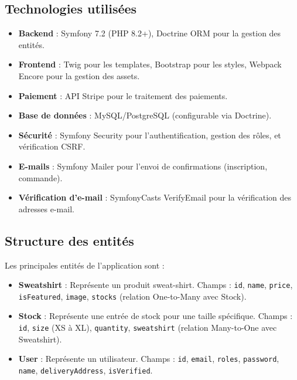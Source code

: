 \documentclass[a4paper,11pt]{article}
\begin{document}
\subsection{Technologies utilisées}
\begin{itemize}
    \item \textbf{Backend} : Symfony 7.2 (PHP 8.2+), Doctrine ORM pour la gestion des entités.
    \item \textbf{Frontend} : Twig pour les templates, Bootstrap pour les styles, Webpack Encore pour la gestion des assets.
    \item \textbf{Paiement} : API Stripe pour le traitement des paiements.
    \item \textbf{Base de données} : MySQL/PostgreSQL (configurable via Doctrine).
    \item \textbf{Sécurité} : Symfony Security pour l'authentification, gestion des rôles, et vérification CSRF.
    \item \textbf{E-mails} : Symfony Mailer pour l'envoi de confirmations (inscription, commande).
    \item \textbf{Vérification d'e-mail} : SymfonyCasts VerifyEmail pour la vérification des adresses e-mail.
\end{itemize}

\subsection{Structure des entités}
Les principales entités de l'application sont :
\begin{itemize}
    \item \textbf{Sweatshirt} : Représente un produit sweat-shirt. Champs : \texttt{id}, \texttt{name}, \texttt{price}, \texttt{isFeatured}, \texttt{image}, \texttt{stocks} (relation One-to-Many avec Stock).
    \item \textbf{Stock} : Représente une entrée de stock pour une taille spécifique. Champs : \texttt{id}, \texttt{size} (XS à XL), \texttt{quantity}, \texttt{sweatshirt} (relation Many-to-One avec Sweatshirt).
    \item \textbf{User} : Représente un utilisateur. Champs : \texttt{id}, \texttt{email}, \texttt{roles}, \texttt{password}, \texttt{name}, \texttt{deliveryAddress}, \texttt{isVerified}.
\end{itemize}
\end{document}
